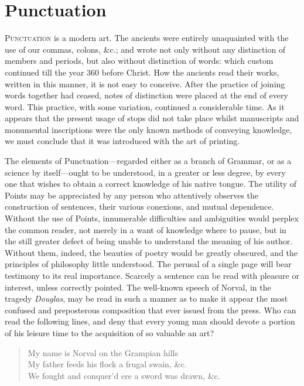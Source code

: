 \chapter{Punctuation}
\textsc{Punctuation} is a modern art. The ancients were entirely unaquainted
with the use of our commas, colons, \&c.; and wrote not only without any
distinction of members and periods, but also without distinction of words: which
custom continued till the year 360 before Christ. How the ancients read their
works, written in this manner, it is not easy to conceive. After the practice of
joining words together had ceased, notes of distinction were placed at the end
of every word. This practice, with some variation, continued a considerable
time. As it appears that the present usage of stops did not take place whilst
manuscripts and monumental inscriptions were the only known methods of conveying
knowledge, we must conclude that it was introduced with the art of printing.

The elements of Punctuation---regarded either as a branch of Grammar, or as a
science by itself---ought to be understood, in a greater or less degree, by
every one that wishes to obtain a correct knowledge of his native tongue. The
utility of Points may be appreciated by any person who attentively observes the
construction of sentences, their various conexions, and mutual dependence.
Without the use of Points, innumerable difficulties and ambiguities would
perplex the common reader, not merely in a want of knowledge where to pause, but
in the still greater defect of being unable to understand the meaning of his
author. Without them, indeed, the beauties of poetry would be greatly obscured,
and the principles of philosophy little understood. The perusal of a single page
will bear testimony to its real importance. Scarcely a sentence can be read with
pleasure or interest, unless correctly pointed. The well-known speech of Norval,
in the tragedy \emph{Douglas}, may be read in such a manner as to make it appear
the most confused and preposterous composition that ever issued from the press.
Who can read the following lines, and deny that every young man should devote a
portion of his leisure time to the acquisition of so valuable an art?

\begin{quote}
    \small
    My name is Norval on the Grampian hills\\
    My father feeds his flock a frugal swain, \&c.\\
    We fought and conquer'd ere a sword was drawn, \&c.
    \normalsize
\end{quote}

